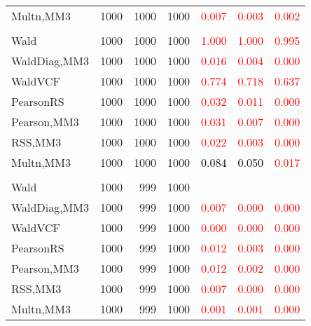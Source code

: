 \documentclass[
]{article}
\begin{document}
\begin{table}[H]
{\begin{tabular}[t]{lrrrrrr}
\hspace{1em}Multn,MM3 & 1000 & 1000 & 1000 & \textcolor{red}{0.007} & \textcolor{red}{0.003} & \textcolor{red}{0.002}\\
\addlinespace[0.3em]
\multicolumn{7}{l}{\textbf{2F 10V}}\\
\hspace{1em}Wald & 1000 & 1000 & 1000 & \textcolor{red}{1.000} & \textcolor{red}{1.000} & \textcolor{red}{0.995}\\
\hspace{1em}WaldDiag,MM3 & 1000 & 1000 & 1000 & \textcolor{red}{0.016} & \textcolor{red}{0.004} & \textcolor{red}{0.000}\\
\hspace{1em}WaldVCF & 1000 & 1000 & 1000 & \textcolor{red}{0.774} & \textcolor{red}{0.718} & \textcolor{red}{0.637}\\
\hspace{1em}PearsonRS & 1000 & 1000 & 1000 & \textcolor{red}{0.032} & \textcolor{red}{0.011} & \textcolor{red}{0.000}\\
\hspace{1em}Pearson,MM3 & 1000 & 1000 & 1000 & \textcolor{red}{0.031} & \textcolor{red}{0.007} & \textcolor{red}{0.000}\\
\hspace{1em}RSS,MM3 & 1000 & 1000 & 1000 & \textcolor{red}{0.022} & \textcolor{red}{0.003} & \textcolor{red}{0.000}\\
\hspace{1em}Multn,MM3 & 1000 & 1000 & 1000 & \textcolor{black}{0.084} & \textcolor{black}{0.050} & \textcolor{red}{0.017}\\
\addlinespace[0.3em]
\multicolumn{7}{l}{\textbf{3F 15V}}\\
\hspace{1em}Wald & 1000 & 999 & 1000 & \textcolor{black}{} & \textcolor{black}{} & \textcolor{black}{}\\
\hspace{1em}WaldDiag,MM3 & 1000 & 999 & 1000 & \textcolor{red}{0.007} & \textcolor{red}{0.000} & \textcolor{red}{0.000}\\
\hspace{1em}WaldVCF & 1000 & 999 & 1000 & \textcolor{red}{0.000} & \textcolor{red}{0.000} & \textcolor{red}{0.000}\\
\hspace{1em}PearsonRS & 1000 & 999 & 1000 & \textcolor{red}{0.012} & \textcolor{red}{0.003} & \textcolor{red}{0.000}\\
\hspace{1em}Pearson,MM3 & 1000 & 999 & 1000 & \textcolor{red}{0.012} & \textcolor{red}{0.002} & \textcolor{red}{0.000}\\
\hspace{1em}RSS,MM3 & 1000 & 999 & 1000 & \textcolor{red}{0.007} & \textcolor{red}{0.000} & \textcolor{red}{0.000}\\
\hspace{1em}Multn,MM3 & 1000 & 999 & 1000 & \textcolor{red}{0.001} & \textcolor{red}{0.001} & \textcolor{red}{0.000}\\
\bottomrule
\end{tabular}}
\endgroup{}
\end{table}
\end{document}
